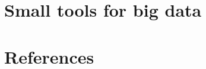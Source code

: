 \documentclass[10pt]{beamer}
\begin{document}


\section{Small tools for big data}
\subsection{}

\begin{frame}
	
\end{frame}

\section{References}
\subsection{}
\begin{frame}[allowframebreaks] 
	\tiny
	
\end{frame}
\end{document}
